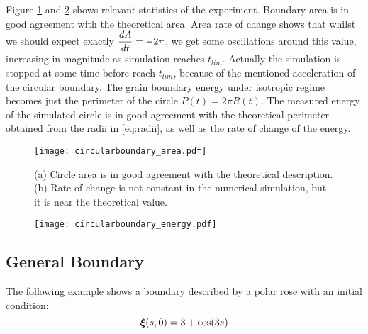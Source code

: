 Figure \ref{fig:circularboundary_area} and \ref{fig:circularboundary_energy} shows relevant statistics of the experiment. Boundary area is in good agreement with the theoretical area. Area rate of change shows that whilst we should expect exactly $\dfrac{dA}{dt} = -2\pi$, we get some oscillations around this value, increasing in magnitude as simulation reaches $t_{lim}$. Actually the simulation is stopped at some time before reach $t_{lim}$, because of the mentioned acceleration of the circular boundary. The grain boundary energy under isotropic regime becomes just the perimeter of the circle $P(t) = 2\pi R(t)$. The measured energy of the simulated circle is in good agreement with the theoretical perimeter obtained from the radii in \eqref{eq:radii}, as well as the rate of change of the energy. 

\begin{figure}
    \centering
    \texttt{[image: circularboundary\_area.pdf]}
    \subfloat[\label{fig:area}]{\hspace{.5\linewidth}}
    \subfloat[\label{fig:dAdt}]{\hspace{.5\linewidth}}
    \caption[Circular boundary area and rate of change]{(a) Circle area is in good agreement with the theoretical description. (b) Rate of change is not constant in the numerical simulation, but it is near the theoretical value.}
    \label{fig:circularboundary_area}
\end{figure}

\begin{figure}
    \centering
    \texttt{[image: circularboundary\_energy.pdf]}
    \subfloat[\label{fig:energy}]{\hspace{.5\linewidth}}
    \subfloat[\label{fig:dEdt}]{\hspace{.5\linewidth}}
    \caption[Circular boundary energy and rate of change]{}
    \label{fig:circularboundary_energy}
\end{figure}

\subsection{General Boundary}

The following example shows a boundary described by a polar rose with an initial condition:
\begin{equation*}
    \bm{\xi}(s,0) = 3 + \cos(3s)
\end{equation*}